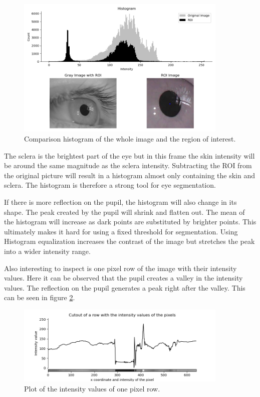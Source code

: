     \begin{figure}[ht]
      \centering
      \includegraphics[width=0.9\textwidth]{plots/histogram_with_roi.png}
      \caption{Comparison histogram of the whole image and the region of interest.}
      \label{fig:hist1}
    \end{figure}

    The sclera is the brightest part of the eye but in this frame the skin intensity will be around the same magnitude as the sclera intensity. Subtracting the ROI from the original picture will result in a histogram almost only containing the skin and sclera. The histogram is therefore a strong tool for eye segmentation. 

    If there is more reflection on the pupil, the histogram will also change in its shape. The peak created by the pupil will shrink and flatten out. The mean of the histogram will increase as dark points are substituted by brighter points. This ultimately makes it hard for using a fixed threshold for segmentation. Using Histogram equalization increases the contrast of the image but stretches the peak into a wider intensity range. 

    Also interesting to inspect is one pixel row of the image with their intensity values. Here it can be observed that the pupil creates a valley in the intensity values. The reflection on the pupil generates a peak right after the valley. This can be seen in figure \ref{fig:row_intens}.
    \begin{figure}[ht]
      \centering
      \includegraphics[width=0.9\textwidth]{plots/row_intensity_valles.png}
      \caption{Plot of the intensity values of one pixel row.}
      \label{fig:row_intens}
    \end{figure}

